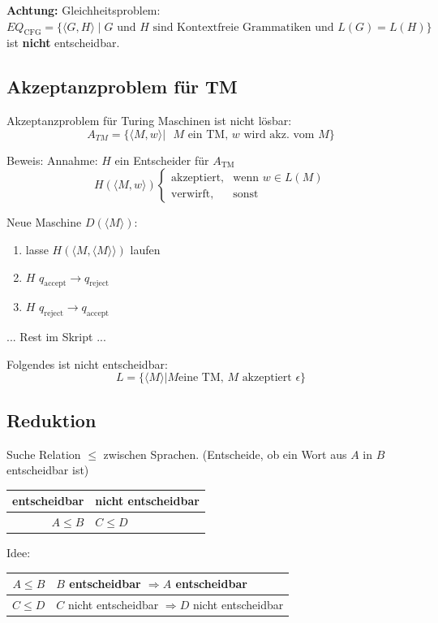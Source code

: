 \documentclass[a4paper]{article}
\begin{document}
	\vspace{2mm}
	\textbf{Achtung:} Gleichheitsproblem: $EQ_{\text{CFG}} = \{ \langle G,H \rangle \mid \text{$G$ und $H$ sind Kontextfreie Grammatiken und $L(G)=L(H)$} \}$ ist \textbf{nicht} entscheidbar.

\subsection{Akzeptanzproblem für TM}
	\begin{fsatz}
	Akzeptanzproblem für Turing Maschinen ist nicht lösbar:
	$$A_{TM} = \{ \langle M,w \rangle | \text{ $M$ ein TM, $w$ wird akz. vom $M$} \}$$
	\end{fsatz}
	
	Beweis: Annahme: $H$ ein Entscheider für $A_{\text{TM}}$
	$$H(\langle M,w \rangle) \begin{cases}
	  \text{akzeptiert},  & \text{wenn }w \in L(M)\\
	  \text{verwirft}, & \text{sonst}
	\end{cases}$$
	
	Neue Maschine $D(\langle M \rangle)$:
	\begin{enumerate}
		\item lasse $H(\langle M, \langle M \rangle \rangle)$ laufen
		\item $H$ $q_{\text{accept}} \rightarrow q_{\text{reject}}$
		\item $H$ $q_{\text{reject}} \rightarrow q_{\text{accept}}$
	\end{enumerate}
	
	... Rest im Skript ...
	
	\begin{fsatz}
	Folgendes ist nicht entscheidbar:
	$$L = \{ \langle M \rangle | M \text{eine TM, } M \text{ akzeptiert } \epsilon \}$$
	\end{fsatz}

\subsection{Reduktion}
	Suche Relation $\leq$ zwischen Sprachen. (Entscheide, ob ein Wort aus $A$ in $B$ entscheidbar ist)
	\begin{tabular}{|r|l|}
		entscheidbar & nicht entscheidbar \\\hline
		$A \leq B $ & $C \leq D$
	\end{tabular}
	Idee:
	\begin{tabular}{r|l}
		$A \leq B$ & $B$ entscheidbar $\Rightarrow A$ entscheidbar \\\hline
		$C \leq D$ & $C$ nicht entscheidbar $\Rightarrow D$ nicht entscheidbar
	\end{tabular}
	
\end{document}
